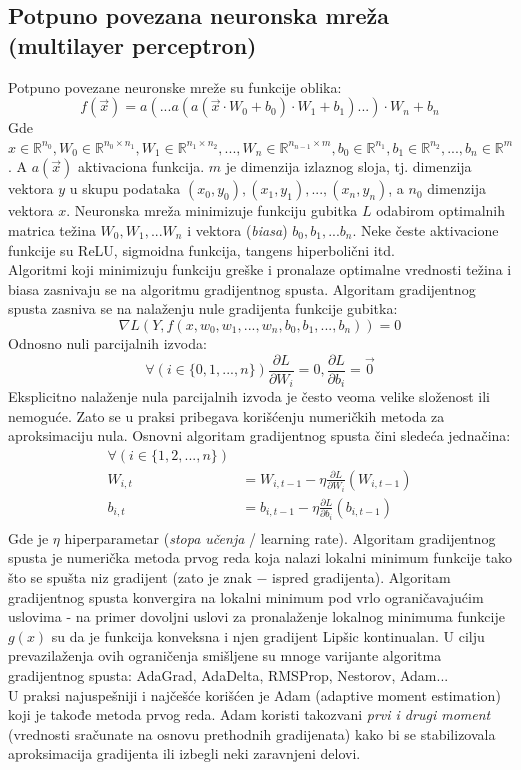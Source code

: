 \documentclass[a4paper,fleqn,12pt]{JMThesis}
\theoremstyle{plain}
\theoremstyle{definition}
\theoremstyle{definition}
\begin{document}
\subsection{Potpuno povezana neuronska mreža (multilayer perceptron)}
Potpuno povezane neuronske mreže su funkcije oblika:
\[
	f(\vec{x}) = a(...a(a(\vec{x} \cdot W_0 + b_0) \cdot W_1 + b_1)...)\cdot W_n + b_n
\]
Gde $x \in \mathbb{R}^{n_0}, W_0 \in \mathbb{R}^{n_0 \times n_1}, W_1 \in \mathbb{R}^{n_1 \times n_2},...,W_n \in \mathbb{R}^{n_{n-1} \times m},
b_0 \in \mathbb{R}^{n_1}, b_1 \in \mathbb{R}^{n_2}, ... , b_n \in \mathbb{R}^{m}$. A $a(\vec{x})$ aktivaciona funkcija.
$m$ je dimenzija izlaznog sloja, tj. dimenzija vektora $y$ u skupu podataka $(x_0,y_0), (x_1,y_1), ... , (x_n, y_n)$, a $n_0$ dimenzija vektora $x$.
Neuronska mreža minimizuje funkciju gubitka $L$ odabirom optimalnih matrica težina $W_0, W_1, ... W_n$ i vektora (\textit{biasa}) $b_0, b_1, ... b_n$.
Neke česte aktivacione funkcije su ReLU, sigmoidna funkcija, tangens hiperbolični itd.\\
Algoritmi koji minimizuju funkciju greške i pronalaze optimalne vrednosti težina i biasa zasnivaju se na algoritmu gradijentnog spusta.
Algoritam gradijentnog spusta zasniva se na nalaženju nule gradijenta funkcije gubitka:
\[ \nabla L(Y,f(x,w_0,w_1,...,w_n,b_0,b_1,...,b_n)) = 0 \]
Odnosno nuli parcijalnih izvoda:
\[ \forall(i \in \{0,1,...,n\}) \frac{\partial L}{\partial W_i} = 0, \frac{\partial L}{\partial b_i} = \vec{0} \]
Eksplicitno nalaženje nula parcijalnih izvoda je često veoma velike složenost ili nemoguće. Zato se u praksi pribegava korišćenju
numeričkih metoda za aproksimaciju nula. Osnovni algoritam gradijentnog spusta čini sledeća jednačina:
\[
	\begin{split}
		\forall (i \in \{1,2,...,n\})\\
		W_{i,t} &= W_{i,t-1} - \eta \frac{\partial L}{\partial W_i}(W_{i,t-1})\\
		b_{i,t} &= b_{i,t-1} - \eta \frac{\partial L}{\partial b_i}(b_{i,t-1})\\
	\end{split}
\]
Gde je $\eta$ hiperparametar (\textit{stopa učenja} / learning rate). Algoritam gradijentnog spusta je numerička metoda prvog reda
koja nalazi lokalni minimum funkcije tako što se spušta niz gradijent (zato je znak $-$ ispred gradijenta). Algoritam gradijentnog spusta
konvergira na lokalni minimum pod vrlo ograničavajućim uslovima - na primer dovoljni uslovi za pronalaženje lokalnog minimuma
funkcije $g(x)$ su da je funkcija konveksna i njen gradijent Lipšic kontinualan. U cilju prevazilaženja ovih ograničenja smišljene su mnoge varijante
algoritma gradijentnog spusta: AdaGrad, AdaDelta, RMSProp, Nestorov, Adam...\\
U praksi najuspešniji i najčešće korišćen je Adam (adaptive moment estimation) koji je takođe metoda prvog reda. Adam koristi
takozvani \textit{prvi i drugi moment} (vrednosti sračunate na osnovu prethodnih gradijenata) kako bi se stabilizovala aproksimacija
gradijenta ili izbegli neki zaravnjeni delovi.
\end{document}
